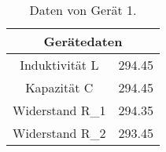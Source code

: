 \begin{table}
	\centering
	\begin{tabular}{c c  }
	\toprule
	\multicolumn{2}{c}{Gerätedaten} \\
	\midrule

 Induktivität L & 294.45 \\
 Kapazität C    & 294.45 \\
 Widerstand R_1 & 294.35 \\
 Widerstand R_2 & 293.45 \\
	\bottomrule
	\end{tabular}
	\caption{Daten von Gerät 1.}
	\label{tab:geraet}
\end{table}

